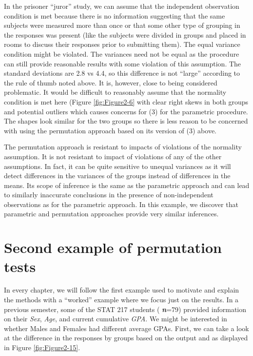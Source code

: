 \documentclass[]{book}
\begin{document}
In the prisoner ``juror'' study, we can assume that the independent
observation condition is met because there is no information suggesting
that the same subjects were measured more than once or that some other
type of grouping in the responses was present (like the subjects were
divided in groups and placed in rooms to discuss their responses prior
to submitting them). The equal variance condition might be violated. The
variances need not be equal as the procedure can still provide
reasonable results with some violation of this assumption. The standard
deviations are 2.8 vs 4.4, so this difference is not ``large'' according
to the rule of thumb noted above. It is, however, close to being
considered problematic. It would be difficult to reasonably assume that
the normality condition is met here (Figure \ref{fig:Figure2-6} with
clear right skews in both groups and potential outliers which causes
concerns for (3) for the parametric procedure. The shapes look similar
for the two groups so there is less reason to be concerned with using
the permutation approach based on its version of (3) above.

The permutation approach is resistant to impacts of violations of the
normality assumption. It is not resistant to impact of violations of any
of the other assumptions. In fact, it can be quite sensitive to unequal
variances as it will detect differences in the variances of the groups
instead of differences in the means. Its scope of inference is the same
as the parametric approach and can lead to similarly inaccurate
conclusions in the presence of non-independent observations as for the
parametric approach. In this example, we discover that parametric and
permutation approaches provide very similar inferences.

\section{Second example of permutation tests}\label{section2-7}

In every chapter, we will follow the first example used to motivate and
explain the methods with a ``worked'' example where we focus just on the
results. In a previous semester, some of the STAT 217 students (
\textbf{\emph{n}}=79) provided information on their \emph{Sex},
\emph{Age}, and current cumulative \emph{GPA}. We might be interested in
whether Males and Females had different average GPAs. First, we can take
a look at the difference in the responses by groups based on the output
and as displayed in Figure \ref{fig:Figure2-15}.
\end{document}
